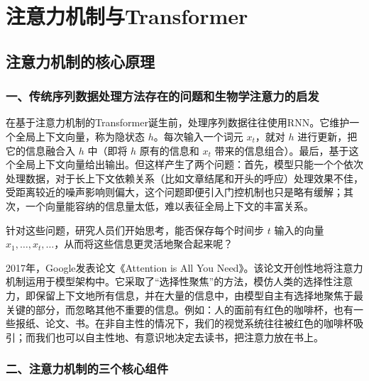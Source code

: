 \hypertarget{ux6ce8ux610fux529bux673aux5236ux4e0etransformer}{%
\chapter{注意力机制与Transformer}\label{ux6ce8ux610fux529bux673aux5236ux4e0etransformer}}

\hypertarget{ux6ce8ux610fux529bux673aux5236ux7684ux6838ux5fc3ux539fux7406}{%
\section{注意力机制的核心原理}\label{ux6ce8ux610fux529bux673aux5236ux7684ux6838ux5fc3ux539fux7406}}

\hypertarget{ux4e00ux4f20ux7edfux5e8fux5217ux6570ux636eux5904ux7406ux65b9ux6cd5ux5b58ux5728ux7684ux95eeux9898ux548cux751fux7269ux5b66ux6ce8ux610fux529bux7684ux542fux53d1}{%
\subsection{一、传统序列数据处理方法存在的问题和生物学注意力的启发}\label{ux4e00ux4f20ux7edfux5e8fux5217ux6570ux636eux5904ux7406ux65b9ux6cd5ux5b58ux5728ux7684ux95eeux9898ux548cux751fux7269ux5b66ux6ce8ux610fux529bux7684ux542fux53d1}}

在基于注意力机制的Transformer诞生前，处理序列数据往往使用RNN。它维护一个全局上下文向量，称为隐状态 \(h\)。每次输入一个词元 \(x_t\)，就对 \(h\) 进行更新，把它的信息融合入 \(h\) 中（即将 \(h\) 原有的信息和 \(x_t\) 带来的信息组合）。最后，基于这个全局上下文向量给出输出。但这样产生了两个问题：首先，模型只能一个个依次处理数据，对于长上下文依赖关系（比如文章结尾和开头的呼应）处理效果不佳，受距离较近的噪声影响则偏大，这个问题即便引入门控机制也只是略有缓解；其次，一个向量能容纳的信息量太低，难以表征全局上下文的丰富关系。

针对这些问题，研究人员们开始思考，能否保存每个时间步 \(t\) 输入的向量 \(x_1,\ldots,x_t,\ldots\)，从而将这些信息更灵活地聚合起来呢？

2017年，Google发表论文《Attention is All You Need》。该论文开创性地将注意力机制运用于模型架构中。它采取了``选择性聚焦''的方法，模仿人类的选择性注意力，即保留上下文地所有信息，并在大量的信息中，由模型自主有选择地聚焦于最关键的部分，而忽略其他不重要的信息。例如：人的面前有红色的咖啡杯，也有一些报纸、论文、书。在非自主性的情况下，我们的视觉系统往往被红色的咖啡杯吸引；而我们也可以自主性地、有意识地决定去读书，把注意力放在书上。

\hypertarget{ux4e8cux6ce8ux610fux529bux673aux5236ux7684ux4e09ux4e2aux6838ux5fc3ux7ec4ux4ef6}{%
\subsection{二、注意力机制的三个核心组件}\label{ux4e8cux6ce8ux610fux529bux673aux5236ux7684ux4e09ux4e2aux6838ux5fc3ux7ec4ux4ef6}}

